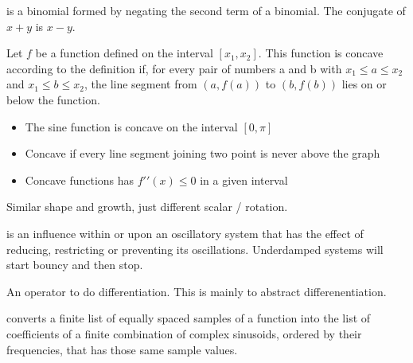 \begin{definition}[Conjugate]
     is a binomial formed by negating the second term of a binomial. The
     conjugate of $x + y$ is $x − y$.

\end{definition}

\begin{definition}[Concave]
    Let $f$ be a function defined on the interval $[x_{1}, x_{2}]$.
    This function is concave according to the definition if, for every pair of
    numbers a and b with $x_{1} \leq a \leq x_{2}$ and $x_{1} \leq b \leq
    x_{2}$, the line segment from $(a,  f (a))$ to $(b,  f (b))$
    lies on or below the function.

    \begin{itemize}
        \item The sine function is concave on the interval $[0, \pi]$
        \item Concave if every line segment joining two point is never above
              the graph 
        \item Concave functions has $f\prime\prime(x) \leq 0$ in a given
              interval 
    \end{itemize}
\end{definition}

\begin{definition}[Congruence]
    Similar shape and growth, just different scalar / rotation.
\end{definition}


\begin{definition}[Damping]
    is an influence within or upon an oscillatory system that has the effect of
    reducing, restricting or preventing its oscillations. 
    Underdamped systems will start bouncy and then stop.

\end{definition}

\begin{definition}
    An operator to do differentiation. This is mainly to abstract
    differenentiation.

\end{definition}

\begin{definition}\label{dft}
    converts a finite list of equally spaced samples of a function into the
    list of coefficients of a finite combination of complex sinusoids, ordered
    by their frequencies, that has those same sample values.

\end{definition}

